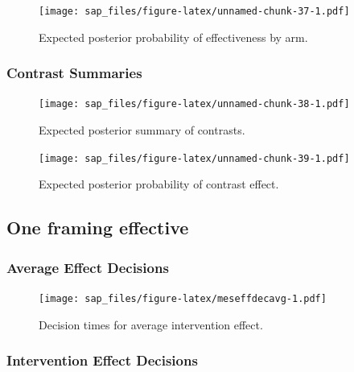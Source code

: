\documentclass[
  bibliography=totoc]{scrreprt}
\begin{document}
\begin{figure}
\centering
\texttt{[image: sap\_files/figure-latex/unnamed-chunk-37-1.pdf]}
\caption{\label{fig:unnamed-chunk-37}Expected posterior probability of effectiveness by arm.}
\end{figure}

\clearpage

\hypertarget{contrast-summaries-2}{%
\subsubsection{Contrast Summaries}\label{contrast-summaries-2}}

\begin{figure}
\centering
\texttt{[image: sap\_files/figure-latex/unnamed-chunk-38-1.pdf]}
\caption{\label{fig:unnamed-chunk-38}Expected posterior summary of contrasts.}
\end{figure}

\begin{figure}
\centering
\texttt{[image: sap\_files/figure-latex/unnamed-chunk-39-1.pdf]}
\caption{\label{fig:unnamed-chunk-39}Expected posterior probability of contrast effect.}
\end{figure}

\clearpage

\hypertarget{one-framing-effective}{%
\subsection{One framing effective}\label{one-framing-effective}}

\hypertarget{average-effect-decisions-3}{%
\subsubsection{Average Effect Decisions}\label{average-effect-decisions-3}}

\begin{figure}
\centering
\texttt{[image: sap\_files/figure-latex/meseffdecavg-1.pdf]}
\caption{\label{fig:meseffdecavg}Decision times for average intervention effect.}
\end{figure}

\clearpage

\hypertarget{intervention-effect-decisions-3}{%
\subsubsection{Intervention Effect Decisions}\label{intervention-effect-decisions-3}}
\end{document}
